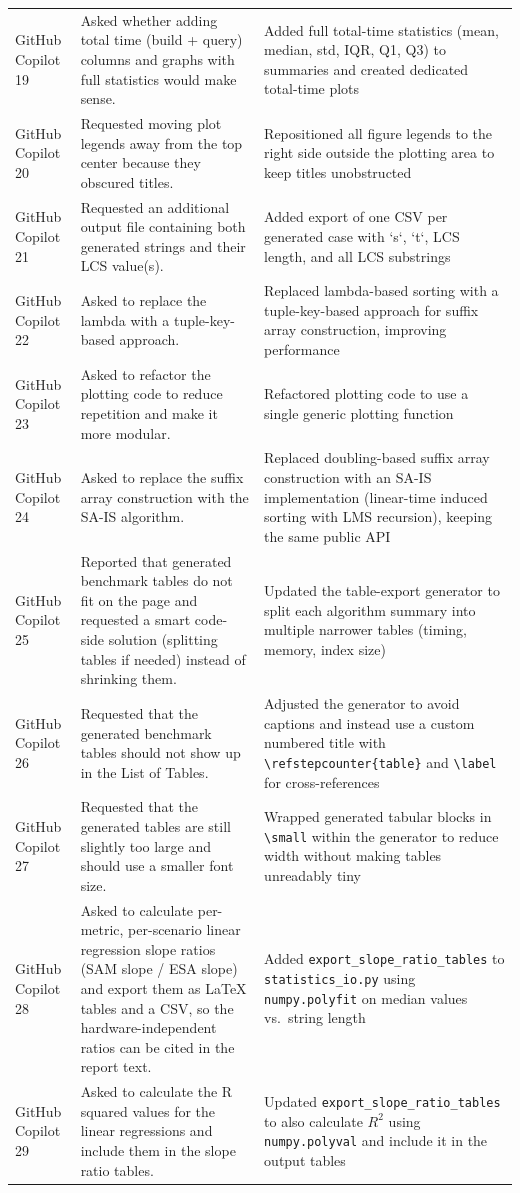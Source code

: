 {\begin{longtable}{p{} p{} p{}}
    GitHub Copilot 19 & Asked whether adding total time (build + query) columns and graphs with full statistics would make sense. & Added full total-time statistics (mean, median, std, IQR, Q1, Q3) to summaries and created dedicated total-time plots \\
    GitHub Copilot 20 & Requested moving plot legends away from the top center because they obscured titles. & Repositioned all figure legends to the right side outside the plotting area to keep titles unobstructed \\
    GitHub Copilot 21 & Requested an additional output file containing both generated strings and their LCS value(s). & Added export of one CSV per generated case with `s`, `t`, LCS length, and all LCS substrings \\
    GitHub Copilot 22 & Asked to replace the lambda with a tuple-key-based approach. & Replaced lambda-based sorting with a tuple-key-based approach for suffix array construction, improving performance \\
    GitHub Copilot 23 & Asked to refactor the plotting code to reduce repetition and make it more modular. & Refactored plotting code to use a single generic plotting function\\
    GitHub Copilot 24 & Asked to replace the suffix array construction with the SA-IS algorithm. & Replaced doubling-based suffix array construction with an SA-IS implementation (linear-time induced sorting with LMS recursion), keeping the same public API\\
    GitHub Copilot 25 & Reported that generated benchmark tables do not fit on the page and requested a smart code-side solution (splitting tables if needed) instead of shrinking them. & Updated the table-export generator to split each algorithm summary into multiple narrower tables (timing, memory, index size)\\
    GitHub Copilot 26 & Requested that the generated benchmark tables should not show up in the List of Tables. & Adjusted the generator to avoid captions and instead use a custom numbered title with \texttt{\textbackslash refstepcounter\{table\}} and \texttt{\textbackslash label} for cross-references\\
    GitHub Copilot 27 & Requested that the generated tables are still slightly too large and should use a smaller font size. & Wrapped generated tabular blocks in \texttt{\textbackslash small} within the generator to reduce width without making tables unreadably tiny\\
    GitHub Copilot 28 & Asked to calculate per-metric, per-scenario linear regression slope ratios (SAM slope / ESA slope) and export them as LaTeX tables and a CSV, so the hardware-independent ratios can be cited in the report text. & Added \texttt{export\_slope\_ratio\_tables} to \texttt{statistics\_io.py} using \texttt{numpy.polyfit} on median values vs.\ string length\\
    GitHub Copilot 29 & Asked to calculate the R squared values for the linear regressions and include them in the slope ratio tables. & Updated \texttt{export\_slope\_ratio\_tables} to also calculate $R^2$ using \texttt{numpy.polyval} and include it in the output tables\\
\end{longtable}
}
